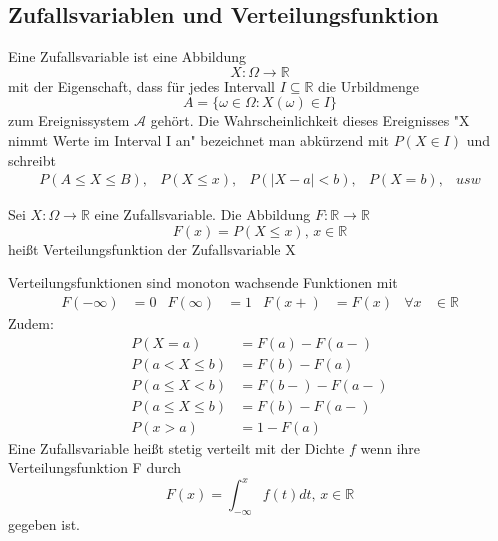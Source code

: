 \documentclass[
	ngerman,
	accentcolor=9c,%
	type=intern,
	marginpar=false
	]{tudapub}
\begin{document}
        \subsection{Zufallsvariablen und Verteilungsfunktion}
            \begin{definition}
                Eine Zufallsvariable ist eine Abbildung
                \begin{equation*}
                    X: \Omega \rightarrow \mathbb{R}
                \end{equation*}
                mit der Eigenschaft, dass für jedes Intervall $I \subseteq \mathbb{R}$ die Urbildmenge
                \begin{equation*}
                    A = \{\omega \in \Omega: X(\omega) \in I\}
                \end{equation*}
                zum Ereignissystem $\mathscr{A}$ gehört. Die Wahrscheinlichkeit dieses Ereignisses "X nimmt Werte im Interval I an" bezeichnet man abkürzend mit $P(X\in I)$ und schreibt
                \begin{align*}
                    P(A \leq X \leq B), & P(X \leq x), & P(|X-a|<b), &P(X=b), & usw
                \end{align*}
            \end{definition}
            \setcounter{satz}{2}
            \begin{definition}
                Sei $X:\Omega \rightarrow \mathbb{R}$ eine Zufallsvariable.
                Die Abbildung $F:\mathbb{R}\rightarrow\mathbb{R}$ 
                \begin{equation*}
                    F(x) = P(X \leq x) \mbox{, } x \in \mathbb{R}
                \end{equation*}
                heißt Verteilungsfunktion der Zufallsvariable X
            \end{definition}
            Verteilungsfunktionen sind monoton wachsende Funktionen mit
            \begin{align*}
                F(-\infty) &= 0 & F(\infty) &=1 & F(x+) &= F(x) & \forall x & \in \mathbb{R} 
            \end{align*}
            Zudem:
            \begin{align*}
                P(X = a) &= F(a) - F(a-)\\
                P(a < X \leq b) &= F(b) - F(a)\\
                P(a \leq X < b) &= F(b-) - F(a-)\\
                P(a \leq X \leq b) &= F(b) - F(a-)\\
                P(x > a) &= 1 - F(a)
            \end{align*}
            Eine Zufallsvariable heißt stetig verteilt mit der Dichte $f$ wenn ihre Verteilungsfunktion F durch
            \begin{equation*}
                F(x) = \int_{- \infty}^x f(t) dt\mbox{, } x \in \mathbb{R} 
            \end{equation*}
            gegeben ist.
\end{document}
